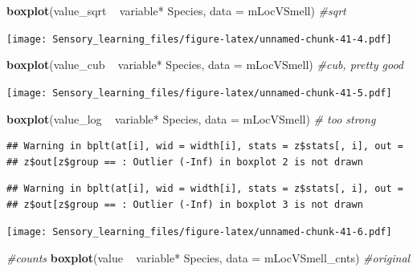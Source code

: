 \documentclass[]{article}
\newenvironment{Shaded}{\begin{snugshade}}{\end{snugshade}}
\newcommand{\KeywordTok}[1]{\textcolor[rgb]{0.13,0.29,0.53}{\textbf{{#1}}}}
\newcommand{\DataTypeTok}[1]{\textcolor[rgb]{0.13,0.29,0.53}{{#1}}}
\newcommand{\StringTok}[1]{\textcolor[rgb]{0.31,0.60,0.02}{{#1}}}
\newcommand{\CommentTok}[1]{\textcolor[rgb]{0.56,0.35,0.01}{\textit{{#1}}}}
\newcommand{\NormalTok}[1]{{#1}}
\begin{document}
\begin{Shaded}
\begin{Highlighting}[]
\KeywordTok{boxplot}\NormalTok{(value_sqrt ~}\StringTok{  }\NormalTok{variable*}\StringTok{ }\NormalTok{Species, }\DataTypeTok{data =} \NormalTok{mLocVSmell) }\CommentTok{#sqrt}
\end{Highlighting}
\end{Shaded}

\texttt{[image: Sensory\_learning\_files/figure-latex/unnamed-chunk-41-4.pdf]}

\begin{Shaded}
\begin{Highlighting}[]
\KeywordTok{boxplot}\NormalTok{(value_cub ~}\StringTok{  }\NormalTok{variable*}\StringTok{ }\NormalTok{Species, }\DataTypeTok{data =} \NormalTok{mLocVSmell) }\CommentTok{#cub, pretty good}
\end{Highlighting}
\end{Shaded}

\texttt{[image: Sensory\_learning\_files/figure-latex/unnamed-chunk-41-5.pdf]}

\begin{Shaded}
\begin{Highlighting}[]
\KeywordTok{boxplot}\NormalTok{(value_log ~}\StringTok{  }\NormalTok{variable*}\StringTok{ }\NormalTok{Species, }\DataTypeTok{data =} \NormalTok{mLocVSmell) }\CommentTok{# too strong}
\end{Highlighting}
\end{Shaded}

\begin{verbatim}
## Warning in bplt(at[i], wid = width[i], stats = z$stats[, i], out =
## z$out[z$group == : Outlier (-Inf) in boxplot 2 is not drawn
\end{verbatim}

\begin{verbatim}
## Warning in bplt(at[i], wid = width[i], stats = z$stats[, i], out =
## z$out[z$group == : Outlier (-Inf) in boxplot 3 is not drawn
\end{verbatim}

\texttt{[image: Sensory\_learning\_files/figure-latex/unnamed-chunk-41-6.pdf]}

\begin{Shaded}
\begin{Highlighting}[]
\CommentTok{#counts}
\KeywordTok{boxplot}\NormalTok{(value ~}\StringTok{  }\NormalTok{variable*}\StringTok{ }\NormalTok{Species, }\DataTypeTok{data =} \NormalTok{mLocVSmell_cnts) }\CommentTok{#original}
\end{Highlighting}
\end{Shaded}
\end{document}
